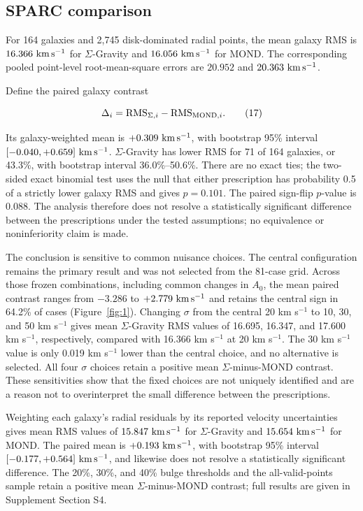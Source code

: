 \documentclass[utf8]{FrontiersinHarvard}
\begin{document}
\subsection{SPARC comparison}\label{sparc-comparison}

For 164 galaxies and 2,745 disk-dominated radial points, the mean galaxy RMS is \(16.366\ {\rm km\,s^{-1}}\) for \(\Sigma\)-Gravity and \(16.056\ {\rm km\,s^{-1}}\) for MOND. The corresponding pooled point-level root-mean-square errors are \(20.952\) and \(20.363\ {\rm km\,s^{-1}}\).

Define the paired galaxy contrast

\[
\Delta_i={\rm RMS}_{\Sigma,i}-{\rm RMS}_{{\rm MOND},i}.
\tag{17}
\]

Its galaxy-weighted mean is \(+0.309\ {\rm km\,s^{-1}}\), with bootstrap 95\% interval \([-0.040,+0.659]\ {\rm km\,s^{-1}}\). \(\Sigma\)-Gravity has lower RMS for 71 of 164 galaxies, or 43.3\%, with bootstrap interval 36.0\%--50.6\%. There are no exact ties; the two-sided exact binomial test uses the null that either prescription has probability 0.5 of a strictly lower galaxy RMS and gives \(p=0.101\). The paired sign-flip \(p\)-value is 0.088. The analysis therefore does not resolve a statistically significant difference between the prescriptions under the tested assumptions; no equivalence or noninferiority claim is made.

The conclusion is sensitive to common nuisance choices. The central configuration remains the primary result and was not selected from the 81-case grid. Across those frozen combinations, including common changes in \(A_0\), the mean paired contrast ranges from \(-3.286\) to \(+2.779\ {\rm km\,s^{-1}}\) and retains the central sign in 64.2\% of cases (Figure~\ref{fig:1}). Changing \(\sigma\) from the central 20 km s\(^{-1}\) to 10, 30, and 50 km s\(^{-1}\) gives mean \(\Sigma\)-Gravity RMS values of 16.695, 16.347, and 17.600 km s\(^{-1}\), respectively, compared with 16.366 km s\(^{-1}\) at 20 km s\(^{-1}\). The 30 km s\(^{-1}\) value is only 0.019 km s\(^{-1}\) lower than the central choice, and no alternative is selected. All four \(\sigma\) choices retain a positive mean \(\Sigma\)-minus-MOND contrast. These sensitivities show that the fixed choices are not uniquely identified and are a reason not to overinterpret the small difference between the prescriptions.

Weighting each galaxy's radial residuals by its reported velocity uncertainties gives mean RMS values of \(15.847\ {\rm km\,s^{-1}}\) for \(\Sigma\)-Gravity and \(15.654\ {\rm km\,s^{-1}}\) for MOND. The paired mean is \(+0.193\ {\rm km\,s^{-1}}\), with bootstrap 95\% interval \([-0.177,+0.564]\ {\rm km\,s^{-1}}\), and likewise does not resolve a statistically significant difference. The 20\%, 30\%, and 40\% bulge thresholds and the all-valid-points sample retain a positive mean \(\Sigma\)-minus-MOND contrast; full results are given in Supplement Section S4.
\end{document}
